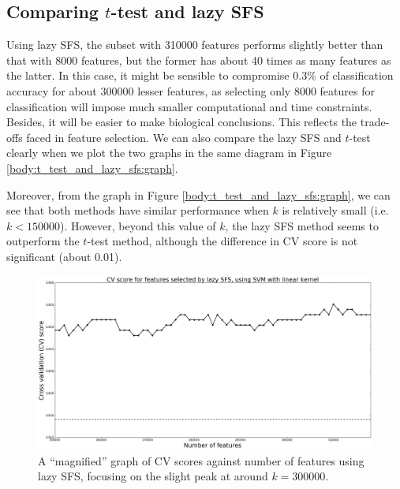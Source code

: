 \documentclass[12pt, twoside, a4paper]{report}
\begin{document}
\subsection{Comparing $t$-test and lazy SFS}
Using lazy SFS, the subset with 310000 features performs slightly better than that with 8000 features, but the former has about 40 times as many features as the latter. In this case, it might be sensible to compromise 0.3\% of classification accuracy for about 300000 lesser features, as selecting only 8000 features for classification will impose much smaller computational and time constraints. Besides, it will be easier to make biological conclusions. This reflects the trade-offs faced in feature selection. We can also compare the lazy SFS and $t$-test clearly when we plot the two graphs in the same diagram in Figure \ref{body:t_test_and_lazy_sfs:graph}.

Moreover, from the graph in Figure \ref{body:t_test_and_lazy_sfs:graph}, we can see that both methods have similar performance when $k$ is relatively small (i.e. $k<150000$). However, beyond this value of $k$, the lazy SFS method seems to outperform the $t$-test method, although the difference in CV score is not significant (about 0.01).

\begin{figure}
\centering
\includegraphics[width=\textwidth]{images/lazy_sfs_smaller_range.jpeg}
\caption{A ``magnified'' graph of CV scores against number of features using lazy SFS, focusing on the slight peak at around $k=300000$.}
\label{body:lazy_sfs_smaller_range:graph}
\end{figure}
\end{document}
